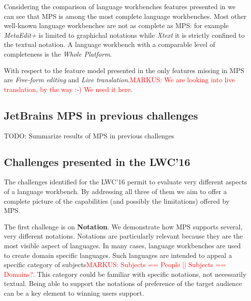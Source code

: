\documentclass[preprint,numbers,10pt]{sigplanconf}
\newcommand\markus[1]{\textcolor{red}{MARKUS: {#1}}}
\begin{document}

Considering the comparison of language workbenches features presented in
\cite{erdweg2015evaluating} we can see that MPS is among the most complete
language workbenches. Most other well-known language workbenches are not as complete as MPS: for example \emph{MetaEdit+} is limited to graphichal notations while \emph{Xtext} \cite{Eysholdt2010} it is strictly confined to the textual notation. A language workbench with a comparable level of completeness is the \emph{Whole
Platform}.
 
With respect to the feature model presented in \cite{erdweg2015evaluating} the
only features missing in MPS are \emph{Free-form editing} and \emph{Live
translation}.\markus{We are looking into live translation, by the way :-) We
need it here.}

\subsection{JetBrains MPS in previous challenges}

TODO: Summarize results of MPS in previous challenges

\subsection{Challenges presented in the LWC'16}

The challenges identified for the LWC'16 permit to evaluate very different aspects
of a language workbench. By addressing all three of them we aim to offer a
complete picture of the capabilities (and possibly the limitations) offered by
MPS.

The first challenge is on \textbf{Notation}. We demonstrate how MPS
supports several, very different notations.
Notations are particularly relevant because they are the most visible aspect of
languages. In many cases, language workbenches are used to create domain
specific languages. Such languages are intended to appeal a specific
category of subjects\markus{Subjects == People || Subjects == Domains?}.
This category could be familiar with specific notations, not necessarily
textual. Being able to support the notations of preference of the target
audience can be a key element to winning users support.
\end{document}
